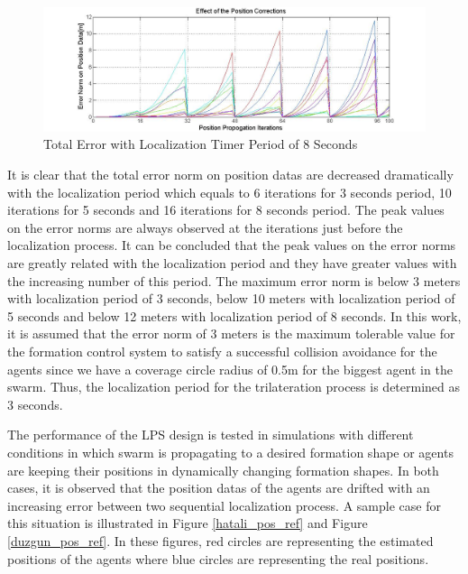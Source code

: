 \begin{figure}[H]
\caption{Total Error with Localization Timer Period of 8 Seconds}
\centerline{\includegraphics[scale = 0.4]{Error-0,5Prop-8Update}}
\end{figure} 		
		
It is clear that the total error norm on position datas are decreased dramatically with the localization period which equals to 6 iterations for 3 seconds period, 10 iterations for 5 seconds and 16 iterations for 8 seconds period. The peak values on the error norms are always observed at the iterations just before the localization process. It can be concluded that the peak values on the error norms are greatly related with the localization period and they have greater values with the increasing number of this period. The maximum error norm is below 3 meters with localization period of 3 seconds, below 10 meters with localization period of 5 seconds and below 12 meters with localization period of 8 seconds. In this work, it is assumed that the error norm of 3 meters is the maximum tolerable value for the formation control system to satisfy a successful collision avoidance for the agents since we have a coverage circle radius of 0.5m for the biggest agent in the swarm. Thus, the localization period for the trilateration process is determined as 3 seconds. 

The performance of the LPS design is tested in simulations with different conditions in which swarm is propagating to a desired formation shape or agents are keeping their positions in dynamically changing formation shapes.  In both cases, it is observed that the position datas of the agents are drifted with an increasing error between two  sequential localization process. A sample case for this situation is illustrated in Figure \ref{hatali_pos_ref} and Figure \ref{duzgun_pos_ref}. In these figures, red circles are representing the estimated positions of the agents where blue circles are representing the real positions. 

